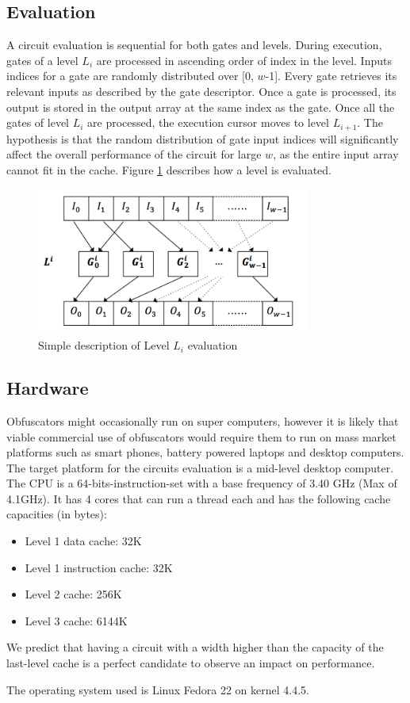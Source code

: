 \subsection{Evaluation}
A circuit evaluation is sequential for both gates and levels. During execution, gates of a level $L_i$ are processed in ascending order of index in the level. Inputs indices for a gate are randomly distributed over [0, $w$-1]. Every gate retrieves its relevant inputs as described by the gate descriptor. Once a gate is processed, its output is stored in the output array at the same index as the gate. Once all the gates of level $L_i$ are processed, the execution cursor moves to level $L_{i+1}$. The hypothesis is that the random distribution of gate input indices will significantly affect the overall performance of the circuit for large $w$, as the entire input array cannot fit in the cache. Figure \ref{fig:level} describes how a level is evaluated.
\begin{figure}[h]
	\center
	\includegraphics[width=0.8\textwidth]{img/level.png}
	\caption{Simple description of Level $L_i$ evaluation}
	\label{fig:level}
\end{figure}
\par
\subsection{Hardware}
Obfuscators might occasionally run on super computers, however it is likely that viable commercial use of obfuscators would require them to run on mass market platforms such as smart phones, battery powered laptops and desktop computers\cite{clark}. The target platform for the circuits evaluation is a mid-level desktop computer. The CPU is a 64-bits-instruction-set with a base frequency of 3.40 GHz (Max of 4.1GHz). It has 4 cores that can run a thread each and has the following cache capacities (in bytes): 
\begin{itemize}[noitemsep]
\item Level 1 data cache: 32K
\item Level 1 instruction cache: 32K
\item Level 2 cache: 256K
\item Level 3 cache: 6144K
\end{itemize}
We predict that having a circuit with a width higher than the capacity of the last-level cache is a perfect candidate to observe an impact on performance.
\par
The operating system used is Linux Fedora 22 on kernel 4.4.5.


